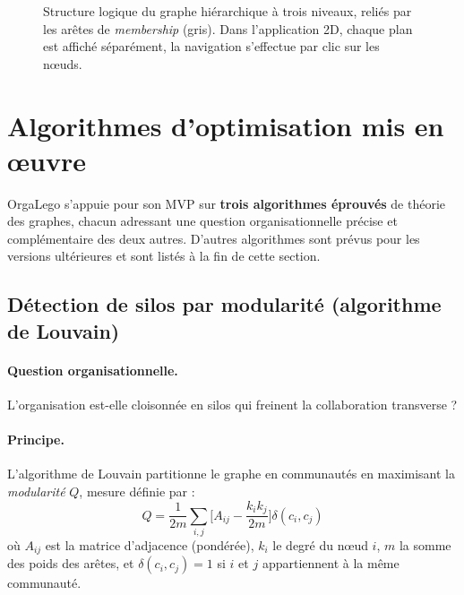 \documentclass[11pt,a4paper]{article}
\begin{document}
\begin{figure}[h]
\caption{Structure logique du graphe hiérarchique à trois niveaux, reliés par les arêtes de \textit{membership} (gris). Dans l'application 2D, chaque plan est affiché séparément, la navigation s'effectue par clic sur les nœuds.}
\label{fig:3d}
\end{figure}

\section{Algorithmes d'optimisation mis en \oe uvre}

OrgaLego s'appuie pour son MVP sur \textbf{trois algorithmes éprouvés} de théorie des graphes, chacun adressant une question organisationnelle précise et complémentaire des deux autres. D'autres algorithmes sont prévus pour les versions ultérieures et sont listés à la fin de cette section.

\subsection{Détection de silos par modularité (algorithme de Louvain)}

\paragraph{Question organisationnelle.} L'organisation est-elle cloisonnée en silos qui freinent la collaboration transverse ?

\paragraph{Principe.} L'algorithme de Louvain partitionne le graphe en communautés en maximisant la \emph{modularité} $Q$, mesure définie par :
\[
Q = \frac{1}{2m}\sum_{i,j}\Big[A_{ij} - \frac{k_i k_j}{2m}\Big]\delta(c_i, c_j)
\]
où $A_{ij}$ est la matrice d'adjacence (pondérée), $k_i$ le degré du nœud $i$, $m$ la somme des poids des arêtes, et $\delta(c_i, c_j) = 1$ si $i$ et $j$ appartiennent à la même communauté.
\end{document}
